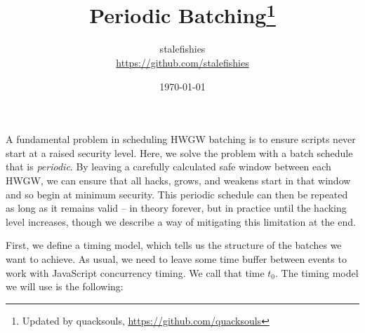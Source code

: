 \documentclass[a4paper,oneside,12pt]{article}
\title{\Large\bf Periodic Batching\footnote{%
    Updated by quacksouls, \url{https://github.com/quacksouls}
  }}
\author{%
  stalefishies \\
  \url{https://github.com/stalefishies}
}
\date{\today}
\begin{document}
\maketitle

\noindent
A fundamental problem in scheduling HWGW batching is to ensure scripts
never start at a raised security level.  Here, we solve the problem
with a batch schedule that is \emph{periodic}.  By leaving a carefully
calculated safe window between each HWGW, we can ensure that all
hacks, grows, and weakens start in that window and so begin at minimum
security.  This periodic schedule can then be repeated as long as it
remains valid -- in theory forever, but in practice until the hacking
level increases, though we describe a way of mitigating this
limitation at the end.

First, we define a timing model, which tells us the structure of the
batches we want to achieve.  As usual, we need to leave some time
buffer between events to work with JavaScript concurrency timing.  We
call that time $t_0$.  The timing model we will use is the following:

\end{document}
